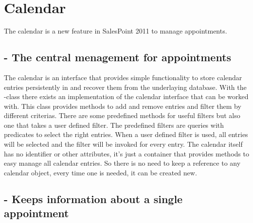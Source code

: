 \section{Calendar}

The calendar is a new feature in SalesPoint 2011 to manage appointments. 

\subsection{ - The central menagement for appointments}
The calendar is an interface that provides simple functionality to store calendar entries persistently in and recover them from the underlaying database.
With the -class there exists an implementation of the calendar interface that can be worked with. This class provides methods
to add and remove entries and filter them by different criterias.
There are some predefined methods for useful filters but also one that takes a user defined filter. The predefined filters are queries with predicates to select the right entries. When a user defined filter is used, all entries will be selected and the filter will be invoked for every entry.  
The  calendar itself has no identifier or other attributes, it's just a container that provides methods to easy manage all calendar entries.
So there is no need to keep a reference to any calendar object, every time one is needed, it can be created new.


\subsection{ - Keeps information about a single appointment}


